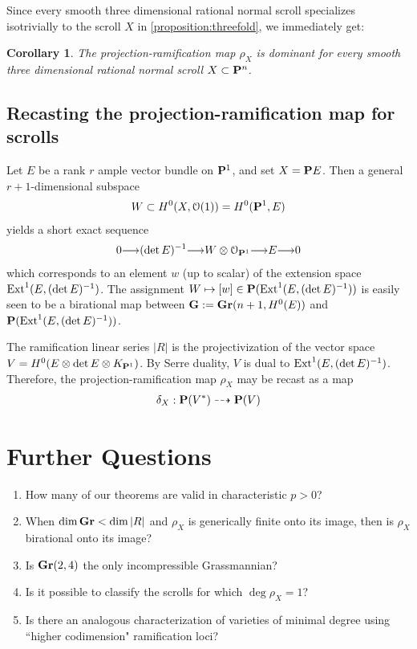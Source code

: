 \documentclass[11pt,reqno]{amsart}
\theoremstyle{plain}
\newtheorem{corollary}[theorem]{Corollary}
\theoremstyle{definition}
\theoremstyle{remark}
\numberwithin{equation}{section}
\DeclareMathOperator{\dm}{dim}
\renewcommand{\to}{{\longrightarrow}}
\numberwithin{equation}{section}
\renewcommand{\O}{\mathcal O}
\newcommand{\G}{\mathbf G}
\begin{document}
Since every smooth three dimensional rational normal scroll specializes isotrivially to the scroll $X$ in \autoref{proposition:threefold}, we immediately get: 

\begin{corollary}\label{corollary:maxVariation3Scrolls}
	The projection-ramification map $\rho_{X}$ is dominant for every smooth three dimensional rational normal scroll $X \subset \P^{n}$.
\end{corollary}

\subsection{Recasting the projection-ramification map for scrolls} Let $E$ be a rank $r$ ample vector bundle on $\P^{1}$, and set $X = \P E$.  Then a general $r+1$-dimensional subspace 
\begin{align*}
    W \subset H^{0}(X, \O(1)) = H^{0}(\P^{1},E)
\end{align*}
yields a short exact sequence 
\begin{align*}
    0 \to (\det E)^{-1} \to W \otimes \O_{\P^{1}} \to E \to 0
\end{align*}
which corresponds to an element $w$ (up to scalar) of the extension space $\Ext^{1}(E,(\det E)^{-1})$. The assignment $W \mapsto [w] \in \P(\Ext^{1}(E,(\det E)^{-1}))$ is easily seen to be a birational map between $\G := \Gr(n+1,H^{0}(E))$ and $\P(\Ext^{1}(E,(\det E)^{-1}))$.

The ramification linear series $|R|$ is the projectivization of the vector space $V = H^{0}(E \otimes \det E \otimes K_{\P^{1}})$.  By Serre duality, $V$ is dual to $\Ext^{1}(E,(\det E)^{-1})$.  Therefore, the projection-ramification map $\rho_{X}$ may be recast as a map
\begin{align*}
    \delta_{X}: \P(V^{*}) \dashrightarrow \P(V)
\end{align*}



\section{Further Questions}

\begin{enumerate}
    \item How many of our theorems are valid in characteristic $p > 0$?  
    \item When $\dm \Gr < \dm |R|$ and $\rho_{X}$ is generically finite onto its image, then is $\rho_X$ birational onto its image?
    \item Is $\Gr(2,4)$ the only incompressible Grassmannian?
    \item Is it possible to classify the scrolls for which $\deg \rho_{X} = 1$?
    \item Is there an analogous characterization of varieties of minimal degree using ``higher codimension" ramification loci?
\end{enumerate}









 
   
\end{document}
